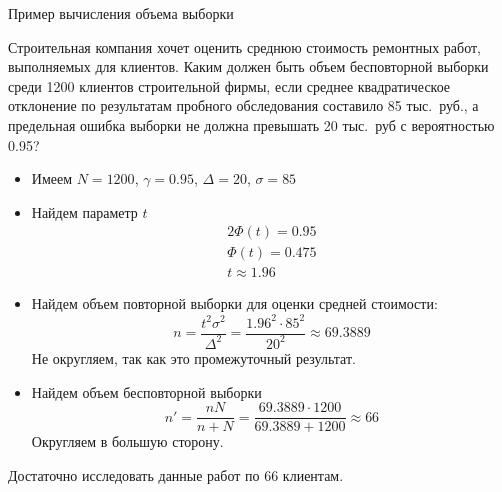 \documentclass[unicode,11pt,notheorems,xcolor=table]{beamer}
\begin{document}
\begin{frame}[allowframebreaks]{Пример вычисления объема выборки}
    \begin{exampleblock}{}
        Строительная компания хочет оценить среднюю стоимость ремонтных работ, выполняемых для клиентов. 
        Каким должен быть объем бесповторной выборки среди 1200 клиентов строительной фирмы, если среднее квадратическое отклонение по результатам пробного обследования составило 85 тыс.~руб., а предельная ошибка выборки не должна превышать 20 тыс.~руб с вероятностью 0.95?
    \end{exampleblock}
    \begin{itemize}
        \item Имеем $N=1200$, $\gamma=0.95$, $\Delta= 20$, $\sigma=85$
        \item Найдем параметр $t$
        \begin{gather*}
            2\Phi(t) = 0.95\\
            \Phi(t) = 0.475\\
            t \approx 1.96
        \end{gather*}
        \item Найдем объем повторной выборки для оценки средней стоимости: 
        $$
            n=\frac{t^2\sigma^2}{\Delta^2} = \frac{1.96^2 \cdot 85^2}{20^2} \approx 69.3889
        $$
        Не округляем, так как это промежуточный результат.
        \item Найдем объем бесповторной выборки 
        $$
            n'= \frac{nN}{n+N}= \frac{69.3889 \cdot 1200}{69.3889+1200}\approx 66
        $$
        Округляем в большую сторону.
    \end{itemize}
     Достаточно исследовать данные работ по 66 клиентам.

\end{frame}
\end{document}
